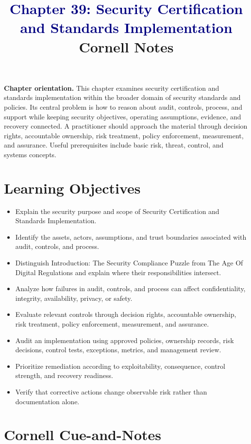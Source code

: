 \documentclass[11pt]{article}
\title{\textcolor{Navy}{Chapter 39: Security Certification and Standards Implementation}\\[2mm]\large Cornell Notes}
\author{}
\date{}
\begin{document}
\maketitle
\thispagestyle{fancy}
\vspace{-1.5em}
\begin{orientationbox}
\textbf{Chapter orientation.} This chapter examines security certification and standards implementation within the broader domain of security standards and policies. Its central problem is how to reason about audit, controls, process, and support while keeping security objectives, operating assumptions, evidence, and recovery connected. A practitioner should approach the material through decision rights, accountable ownership, risk treatment, policy enforcement, measurement, and assurance. Useful prerequisites include basic risk, threat, control, and systems concepts.
\end{orientationbox}
\section*{Learning Objectives}
\begin{itemize}
\item Explain the security purpose and scope of Security Certification and Standards Implementation.
\item Identify the assets, actors, assumptions, and trust boundaries associated with audit, controls, and process.
\item Distinguish Introduction: The Security Compliance Puzzle from The Age Of Digital Regulations and explain where their responsibilities intersect.
\item Analyze how failures in audit, controls, and process can affect confidentiality, integrity, availability, privacy, or safety.
\item Evaluate relevant controls through decision rights, accountable ownership, risk treatment, policy enforcement, measurement, and assurance.
\item Audit an implementation using approved policies, ownership records, risk decisions, control tests, exceptions, metrics, and management review.
\item Prioritize remediation according to exploitability, consequence, control strength, and recovery readiness.
\item Verify that corrective actions change observable risk rather than documentation alone.
\end{itemize}
\section*{Cornell Cue-and-Notes}
\end{document}

